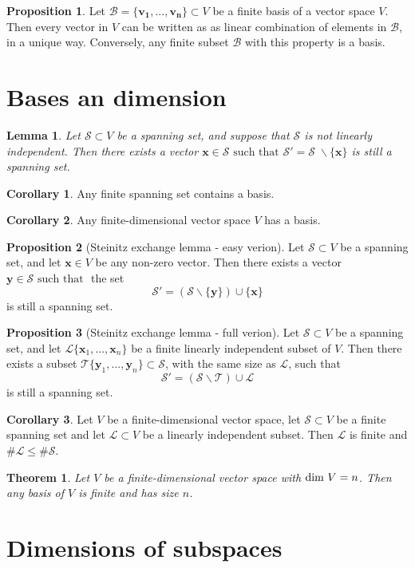 \documentclass[11pt,a4paper]{article}
\newcommand\Sf{\mathcal{S}}
\newcommand\st{\text{ such that }}
\newtheorem{lemma}{Lemma}
\newtheorem{theorem}{Theorem}
\theoremstyle{definition}
\newtheorem{proposition}{Proposition}
\newtheorem{corollary}{Corollary}
\begin{document}
\begin{proposition}
    Let $ \mathcal{B} = \{ \mathbf{v_1}, ..., \mathbf{v_n} \} \subset V $ be a finite basis of a vector space $ V $. Then every vector in $ V $ can be written as as linear combination of elements in $ \mathcal{B} $, in a unique way.
    Conversely, any finite subset $ \mathcal{B} $ with this property is a basis.
\end{proposition}

\section{Bases an dimension}

\begin{lemma}
    Let $ \mathcal{S} \subset V $ be a spanning set, and suppose that $\mathcal{S}$ is not linearly independent.
    Then there exists a vector $ \mathbf{x} \in \Sf \st \Sf' = \Sf  \; \backslash \{ \mathbf{x} \} $ is still a spanning set.
\end{lemma}

\begin{corollary}
    Any finite spanning set contains a basis. 
\end{corollary}

\begin{corollary}
    Any finite-dimensional vector space $ V $ has a basis.
\end{corollary}

\begin{proposition}[Steinitz exchange lemma - easy verion]
    Let $ \Sf \subset V $ be a spanning set, and let $ \mathbf{x} \in V $ be any non-zero vector. Then there exists a vector $ \mathbf{y} \in \Sf \st $ the set
    \[ \Sf' = (\Sf \backslash \{ \mathbf{y} \}) \cup \{ \mathbf{x} \} \]
    is still a spanning set.
\end{proposition}

\begin{proposition}[Steinitz exchange lemma - full verion]
    Let $ \Sf \subset V $ be a spanning set, and let $ \mathcal{L} \{ \mathbf{x}_1, ..., \mathbf{x}_n \}$ be a finite linearly independent subset of $ V $. 
    Then there exists a subset $ \mathcal{T} \{ \mathbf{y}_1, ..., \mathbf{y}_n \}\subset \Sf $, with the same size as $ \mathcal{L} $, such that  
    \[ \Sf' = (\Sf \backslash \mathcal{T}) \cup \mathcal{L} \]
    is still a spanning set.
\end{proposition}

\begin{corollary}
    Let $ V $ be a finite-dimensional vector space, let $ \Sf \subset V $ be a finite spanning set and let $ \mathcal{L} \subset V $ be a linearly independent subset. 
    Then $ \mathcal{L} $ is finite and $\# \mathcal{L} \leq \# \Sf $.
\end{corollary}

\begin{theorem}
    Let $ V $ be a finite-dimensional vector space with $ \textup{dim } V = n $. Then any basis of $ V $ is finite and has size $ n $.
\end{theorem}

\section{Dimensions of subspaces}
    
\end{document}
